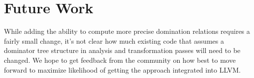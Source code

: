 \documentclass[a4paper,twocolumn]{article}
\begin{document}
\section*{Future Work}
While adding the ability to compute more precise domination relations requires
a fairly small change, it's not clear how much existing code that assumes a 
dominator tree structure in analysis and transformation passes will need to be
changed. We hope to get feedback from the community on how best to move forward
to maximize likelihood of getting the approach integrated into LLVM. 
\end{document}
